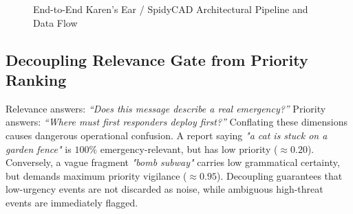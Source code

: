 \documentclass[10pt,a4paper]{article}
\begin{document}
\begin{figure}[htbp]
  \vspace{-0.1cm}
  \caption{End-to-End Karen's Ear / SpidyCAD Architectural Pipeline and Data Flow}
  \label{fig:architecture_pipeline}
\end{figure}

\subsection{Decoupling Relevance Gate from Priority Ranking}
Relevance answers: \emph{``Does this message describe a real emergency?''} Priority answers: \emph{``Where must first responders deploy first?''} Conflating these dimensions causes dangerous operational confusion. A report saying \emph{"a cat is stuck on a garden fence"} is $100\%$ emergency-relevant, but has low priority ($\approx 0.20$). Conversely, a vague fragment \emph{"bomb subway"} carries low grammatical certainty, but demands maximum priority vigilance ($\approx 0.95$). Decoupling guarantees that low-urgency events are not discarded as noise, while ambiguous high-threat events are immediately flagged.

\end{document}
